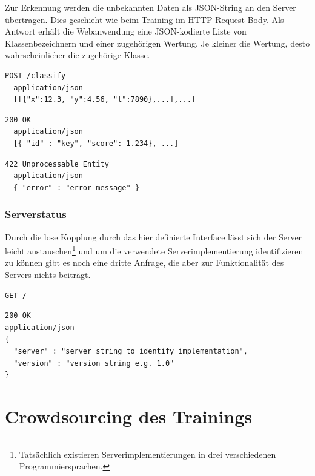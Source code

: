 Zur Erkennung werden die unbekannten Daten als \ac{JSON}-String an den Server übertragen. Dies geschieht wie beim Training im \ac{HTTP}-Request-Body. Als Antwort erhält die Webanwendung eine \ac{JSON}-kodierte Liste von Klassenbezeichnern und einer zugehörigen Wertung. Je kleiner die Wertung, desto wahrscheinlicher die zugehörige Klasse.

\begin{lstlisting}[caption={Anfrage}]
  POST /classify
  application/json
  [[{"x":12.3, "y":4.56, "t":7890},...],...]
\end{lstlisting}
\begin{lstlisting}[caption={Antwort}]
  200 OK
  application/json
  [{ "id" : "key", "score": 1.234}, ...]
\end{lstlisting}
\begin{lstlisting}[caption={Antwort im Fehlerfall}]
  422 Unprocessable Entity
  application/json
  { "error" : "error message" }
\end{lstlisting}

\subsubsection{Serverstatus}

Durch die lose Kopplung durch das hier definierte Interface lässt sich der Server leicht austauschen\footnote{Tatsächlich existieren Serverimplementierungen in drei verschiedenen Programmiersprachen.} und um die verwendete Serverimplementierung identifizieren zu können gibt es noch eine dritte Anfrage, die aber zur Funktionalität des Servers nichts beiträgt.

\begin{lstlisting}[caption={Anfrage}]
GET /
\end{lstlisting}
\begin{lstlisting}[caption={Antwort}]
200 OK
application/json
{ 
  "server" : "server string to identify implementation",
  "version" : "version string e.g. 1.0"
}
\end{lstlisting}
  



\section{Crowdsourcing des Trainings} %
\label{sec:crowdsourcing}

